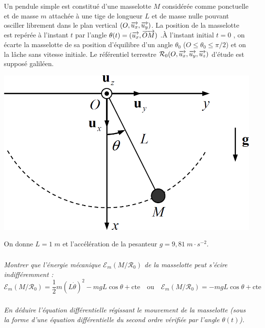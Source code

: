 \documentclass[10pt,oneside]{article}
\begin{document}
\begin{minipage}[c]{.6\linewidth}
Un pendule simple est constitué d’une masselotte $M$ considérée comme ponctuelle et de masse $m$ attachée à une tige de longueur $L$ et de masse nulle pouvant osciller librement dans le plan vertical $(O ,\overrightarrow{u_x} ,\overrightarrow{u_y} )$. La position de la masselotte
est repérée à l’instant $t$ par l’angle $\theta(t) = (\overrightarrow{u_x} , \overrightarrow{OM})$ .À l’instant initial $t = 0$ , on écarte la masselotte de sa position d’équilibre d’un angle  $\theta_0$  ($O\leq \theta_0\leq\pi/2$) et on la lâche sans vitesse initiale. Le
référentiel terrestre $\mathcal{R}_0(O,\overrightarrow{u_x},\overrightarrow{u_y},\overrightarrow{u_z})$ d’étude est supposé galiléen.
\end{minipage}\hfill
\begin{minipage}[c]{.35\linewidth}
\begin{center}
\includegraphics[width=.95\textwidth]{images/pendule}
\end{center}
\end{minipage}

On donne $L=1\;m$ et l'accélération de la pesanteur $g=9,81\; m\cdot s^{-2}$. 


\subparagraph{\label{q1}}
\textit{Montrer que l’énergie mécanique $\mathcal{E}_m(M/\mathcal{R_0})$ de la masselotte peut s'écire indifféremment :}
\begin{equation}
\label{eq1}
\mathcal{E}_m(M/\mathcal{R_0}) = \dfrac{1}{2}m\left( L\dot{\theta} \right)^2 -mgL\cos\theta + \text{cte} \quad \text{ou}\quad \mathcal{E}_m(M/\mathcal{R_0}) = -mgL\cos\theta + \text{cte}
\end{equation}

\subparagraph{}
\textit{En déduire l'équation différentielle régissant le mouvement de la masselotte (sous la forme d’une équation différentielle du second ordre vérifiée par l’angle $\theta(t)$).}
\end{document}
